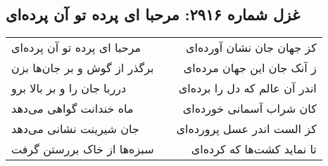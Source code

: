 \begin{center}
\section*{غزل شماره ۲۹۱۶: مرحبا ای پرده تو آن پرده‌ای}
\label{sec:2916}
\begin{longtable}{l p{0.5cm} r}
مرحبا ای پرده تو آن پرده‌ای
&&
کز جهان جان نشان آورده‌ای
\\
برگذر از گوش و بر جان‌ها بزن
&&
ز آنک جان این جهان مرده‌ای
\\
درربا جان را و بر بالا برو
&&
اندر آن عالم که دل را برده‌ای
\\
ماه خندانت گواهی می‌دهد
&&
کان شراب آسمانی خورده‌ای
\\
جان شیرینت نشانی می‌دهد
&&
کز الست اندر عسل پرورده‌ای
\\
سبزه‌ها از خاک بررستن گرفت
&&
تا نماید کشت‌ها که کرده‌ای
\\
\end{longtable}
\end{center}
